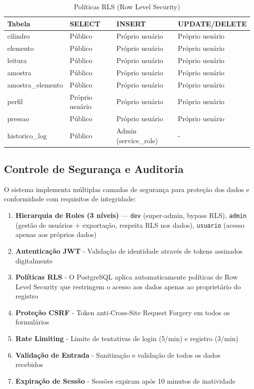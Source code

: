 \documentclass[12pt,a4paper]{article}
\begin{document}
\begin{table}[h!]
\centering
\caption{Políticas RLS (Row Level Security)}
\label{tab:rls}
\begin{tabular}{@{}llll@{}}
\toprule
\textbf{Tabela} & \textbf{SELECT} & \textbf{INSERT} & \textbf{UPDATE/DELETE} \\
\midrule
cilindro & Público & Próprio usuário & Próprio usuário \\
elemento & Público & Próprio usuário & Próprio usuário \\
leitura & Público & Próprio usuário & Próprio usuário \\
amostra & Público & Próprio usuário & Próprio usuário \\
amostra\_elemento & Público & Próprio usuário & Próprio usuário \\
perfil & Próprio usuário & Próprio usuário & Próprio usuário \\
pressao & Público & Próprio usuário & Próprio usuário \\
historico\_log & Público & Admin (service\_role) & - \\
\bottomrule
\end{tabular}
\end{table}

\subsection{Controle de Segurança e Auditoria}

O sistema implementa múltiplas camadas de segurança para proteção dos dados e conformidade com requisitos de integridade:

\begin{enumerate}
\item \textbf{Hierarquia de Roles (3 níveis)} — \texttt{dev} (super-admin, bypass RLS), \texttt{admin} (gestão de usuários + exportação, respeita RLS nos dados), \texttt{usuario} (acesso apenas aos próprios dados)
\item \textbf{Autenticação JWT} - Validação de identidade através de tokens assinados digitalmente
\item \textbf{Políticas RLS} - O PostgreSQL aplica automaticamente políticas de Row Level Security que restringem o acesso aos dados apenas ao proprietário do registro
\item \textbf{Proteção CSRF} - Token anti-Cross-Site Request Forgery em todos os formulários
\item \textbf{Rate Limiting} - Limite de tentativas de login (5/min) e registro (3/min)
\item \textbf{Validação de Entrada} - Sanitização e validação de todos os dados recebidos
\item \textbf{Expiração de Sessão} - Sessões expiram após 10 minutos de inatividade
\end{enumerate}
\end{document}
